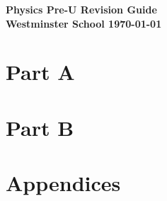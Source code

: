 \documentclass[a4paper,11pt,twoside]{memoir}
\newcommand{\theversion}{}
\newcounter{spec}[chapter]
\begin{document}
\raggedbottom
\frontmatter
\small\forkme[east]
\begin{titlingpage}
    \vspace*{\fill}
    \begin{center}\Huge\bfseries Physics Pre-U Revision Guide \\ \vspace{3cm} \Large Westminster School
    \vfill \today \\ \theversion \end{center}
	\thispagestyle{empty}
\end{titlingpage}

\tableofcontents



\mainmatter
\part*{Part A}









\part*{Part B}











\appendix
\part*{Appendices}



\backmatter
\end{document}
